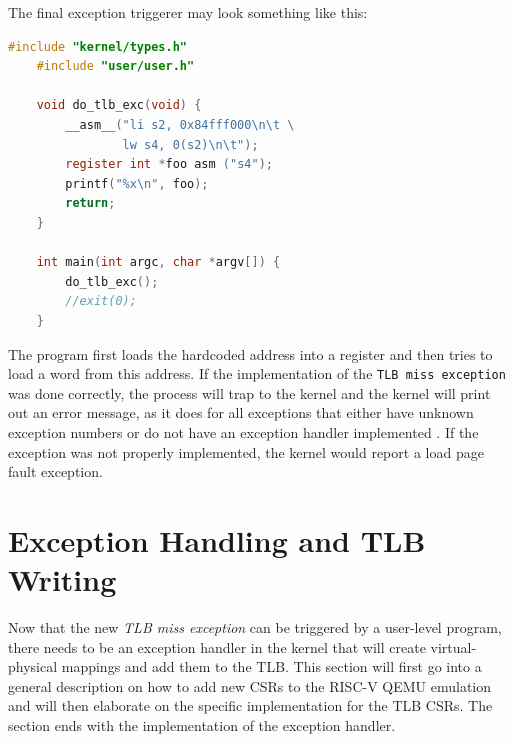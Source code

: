 The final exception triggerer may look something like this:
\begin{lstlisting}[language=c,float=h!,label={impl:excptTrigger},caption={\textbf{Exception Triggerer} Trying to
    load from a hardcoded address prompts the emulated hardware to trigger a TLB miss exception.}]
    #include "kernel/types.h"
    #include "user/user.h"

    void do_tlb_exc(void) {
        __asm__("li s2, 0x84fff000\n\t \
                lw s4, 0(s2)\n\t");
        register int *foo asm ("s4");
        printf("%x\n", foo);
        return;
    }

    int main(int argc, char *argv[]) {
        do_tlb_exc();
        //exit(0);
    }
\end{lstlisting}



The program first loads the hardcoded address into a register and then tries to load a word from this address.
If the implementation of the \texttt{TLB miss exception} was done correctly, the process will trap to the kernel
and the kernel will print out an error message, as it does for all exceptions that either have unknown exception
numbers or do not have an exception handler implemented \cite{cox2011xv6}.
If the exception was not properly implemented, the kernel would report a load page fault exception.




\section{Exception Handling and TLB Writing}
\label{sect:tlbwrite}

Now that the new \textit{TLB miss exception} can be triggered by a user-level program, there needs
to be an exception handler in the kernel that will create virtual-physical mappings and add them to the
TLB.
This section will first go into a general description on how to add new CSRs to the RISC-V QEMU emulation and
will then elaborate on the specific implementation for the TLB CSRs.
The section ends with the implementation of the exception handler.

